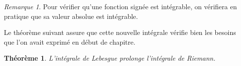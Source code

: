 \documentclass[french]{report}
\theoremstyle{plain}
\newtheorem{thm}{Théorème}[section]
\theoremstyle{definition}
\theoremstyle{remark}
\newtheorem{rem}{Remarque}[section]
\begin{document}
\begin{rem}
  Pour vérifier qu'une fonction signée est intégrable, on vérifiera en pratique que sa valeur absolue est intégrable.
\end{rem}

Le théorème suivant assure que cette nouvelle intégrale vérifie bien les besoins que l'on avait exprimé en début de chapitre.

\begin{thm}
  L'intégrale de Lebesgue prolonge l'intégrale de Riemann.
\end{thm}
\end{document}
